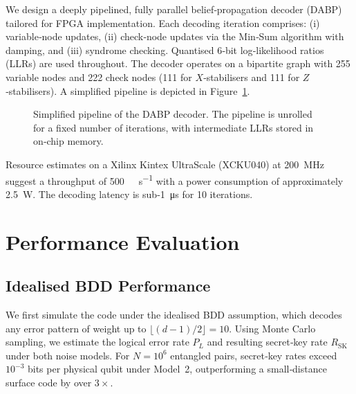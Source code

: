 \documentclass[conference]{IEEEtran}
\begin{document}
We design a deeply pipelined, fully parallel belief‑propagation decoder (DABP) tailored for FPGA implementation.  Each decoding iteration comprises: (i) variable‑node updates, (ii) check‑node updates via the Min‑Sum algorithm with damping, and (iii) syndrome checking.  Quantised 6‑bit log‑likelihood ratios (LLRs) are used throughout.  The decoder operates on a bipartite graph with 255 variable nodes and 222 check nodes (111 for $X$‑stabilisers and 111 for $Z$‑stabilisers).  A simplified pipeline is depicted in Figure~\ref{fig:dabp}.

\begin{figure}[t]
  \centering
  \caption{Simplified pipeline of the DABP decoder.  The pipeline is unrolled for a fixed number of iterations, with intermediate LLRs stored in on‑chip memory.}
  \label{fig:dabp}
\end{figure}

Resource estimates on a Xilinx Kintex UltraScale (XCKU040) at \SI{200}{\mega\hertz} suggest a throughput of \SI{500}{\mega\codeword\per\second} with a power consumption of approximately \SI{2.5}{\watt}.  The decoding latency is sub‑\SI{1}{\micro\second} for 10 iterations.

\section{Performance Evaluation}

\subsection{Idealised BDD Performance}
We first simulate the code under the idealised BDD assumption, which decodes any error pattern of weight up to $\lfloor (d-1)/2 \rfloor=10$.  Using Monte Carlo sampling, we estimate the logical error rate $P_L$ and resulting secret‑key rate $R_{\mathrm{SK}}$ under both noise models.  For $N=10^6$ entangled pairs, secret‑key rates exceed $10^{-3}$ bits per physical qubit under Model 2, outperforming a small‑distance surface code by over $3\times$.
\end{document}

